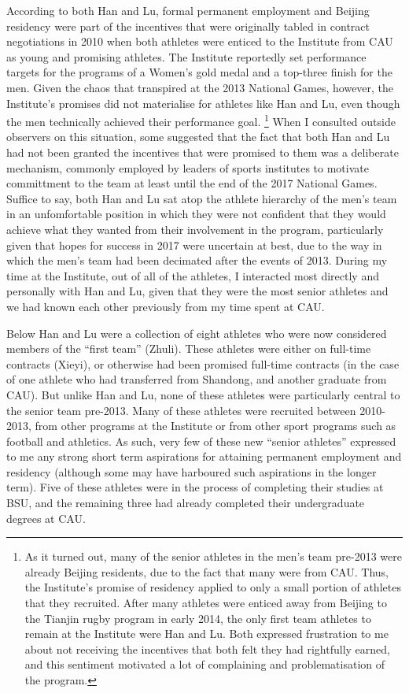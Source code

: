 According to both Han and Lu, formal permanent employment and Beijing residency were part of the incentives that were originally tabled in contract negotiations in 2010 when both athletes were enticed to the Institute from CAU as young and promising athletes.  The Institute reportedly set performance targets for the programs of a Women's gold medal and a top-three finish for the men.  Given the chaos that transpired at the 2013 National Games, however, the Institute's promises did not materialise for athletes like Han and Lu, even though the men technically achieved their performance goal.
    \footnote{As it turned out, many of the senior athletes in the men's team pre-2013 were already Beijing residents, due to the fact that many were from CAU.  Thus, the Institute's promise of residency applied to only a small portion of athletes that they recruited.  After many athletes were enticed away from Beijing to the Tianjin rugby program in early 2014, the only first team athletes to remain at the Institute were Han and Lu.  Both expressed frustration to me about not receiving the incentives that both felt they had rightfully earned, and this sentiment motivated a lot of complaining and problematisation of the program.}
When I consulted outside observers on this situation, some suggested that the fact that both Han and Lu had not been granted the incentives that were promised to them was a deliberate mechanism, commonly employed by leaders of sports institutes to motivate committment to the team at least until the end of the 2017 National Games.  Suffice to say, both Han and Lu sat atop the athlete hierarchy of the men's team in an unfomfortable position in which they were not confident that they would achieve what they wanted from their involvement in the program, particularly given that hopes for success in 2017 were uncertain at best, due to the way in which the men's team had been decimated after the events of 2013. During my time at the Institute, out of all of the athletes, I interacted most directly and personally with Han and Lu, given that they were the most senior athletes and we had known each other previously from my time spent at CAU.


Below Han and Lu were a collection of eight athletes who were now considered members of the ``first team'' (Zhuli).   These athletes were either on full-time contracts (Xieyi), or otherwise had been promised full-time contracts (in the case of one athlete who had transferred from Shandong, and another graduate from CAU). But unlike Han and Lu, none of these athletes were particularly central to the senior team pre-2013.  Many of these athletes were recruited between 2010-2013, from other programs at the Institute or from other sport programs such as football and athletics.  As such, very few of these new ``senior athletes'' expressed to me any strong short term aspirations for attaining permanent employment and residency (although some may have harboured such aspirations in the longer term). Five of these athletes were in the process of completing their studies at BSU, and the remaining three had already completed their undergraduate degrees at CAU.

